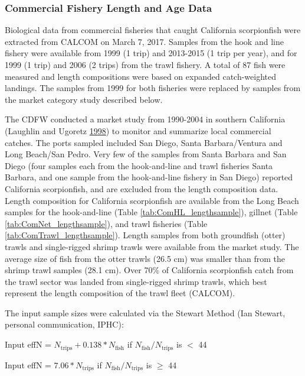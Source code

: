 \documentclass[12pt,]{article}
\begin{document}
\subsubsection{Commercial Fishery Length and Age
Data}\label{commercial-fishery-length-and-age-data}

Biological data from commercial fisheries that caught California
scorpionfish were extracted from CALCOM on March 7, 2017. Samples from
the hook and line fishery were available from 1999 (1 trip) and
2013-2015 (1 trip per year), and for 1999 (1 trip) and 2006 (2 trips)
from the trawl fishery. A total of 87 fish were measured and length
compositions were based on expanded catch-weighted landings. The samples
from 1999 for both fisheries were replaced by samples from the market
category study described below.

The CDFW conducted a market study from 1990-2004 in southern California
(Laughlin and Ugoretz \protect\hyperlink{ref-Laughlin1998}{1998}) to
monitor and summarize local commercial catches. The ports sampled
included San Diego, Santa Barbara/Ventura and Long Beach/San Pedro. Very
few of the samples from Santa Barbara and San Diego (four samples each
from the hook-and-line and trawl fisheries Santa Barbara, and one sample
from the hook-and-line fishery in San Diego) reported California
scorpionfish, and are excluded from the length composition data. Length
composition for California scorpionfish are available from the Long
Beach samples for the hook-and-line (Table
\ref{tab:ComHL_lengthsample}), gillnet (Table
\ref{tab:ComNet_lengthsample}), and trawl fisheries (Table
\ref{tab:ComTrawl_lengthsample}). Length samples from both groundfish
(otter) trawls and single-rigged shrimp trawls were available from the
market study. The average size of fish from the otter trawls (26.5 cm)
was smaller than from the shrimp trawl samples (28.1 cm). Over 70\% of
California scorpionfish catch from the trawl sector was landed from
single-rigged shrimp trawls, which best represent the length composition
of the trawl fleet (CALCOM).

The input sample sizes were calculated via the Stewart Method (Ian
Stewart, personal communication, IPHC):

\begin{centering}

Input effN = $N_{\text{trips}} + 0.138 * N_{\text{fish}}$ if $N_{\text{fish}}/N_{\text{trips}}$ is $<$ 44

Input effN = $7.06 * N_{\text{trips}}$ if $N_{\text{fish}}/N_{\text{trips}}$ is $\geq$ 44

\end{centering}
\end{document}

